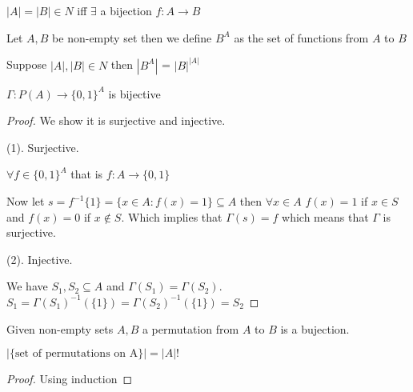 \begin{theorem}
    $|A| = |B| \in N$ iff  $\exists $ a bijection $f : A \rightarrow B$
\end{theorem}

\begin{definition}
    Let $A,B$ be non-empty set then we define $B^{A}$ as the set of functions from $A$ to $B$
\end{definition}

\begin{theorem}
    Suppose $|A|,|B| \in N$ then $|B^{A}|$ = $|B|^{|A|}$
\end{theorem}

\begin{theorem}
    $\Gamma: P(A) \rightarrow \{0,1\}^{A}$ is bijective
\end{theorem}
\begin{proof}
    We show it is surjective and injective.

    (1). Surjective.

    $\forall f \in \{0,1\}^{A}$ that is $f: A \rightarrow \{0,1\}$

Now let  $s = f^{-1}\{1\} = \{x \in A: f(x) = 1\} \subseteq A$ then $\forall x \in A$ $f(x) = 1 $ if $x \in S$ and $f(x) = 0$ if $x \not \in S$. Which implies that  $\Gamma (s) = f$ which means that  $\Gamma$ is surjective.

(2). Injective.

We have $S_1,S_2 \subseteq A$ and $\Gamma(S_1) = \Gamma (S_2)$. $S_1 = \Gamma(S_1)^{-1}(\{1\}) = \Gamma (S_2)^{-1}(\{1\}) = S_2$
\end{proof}
\begin{definition}

    Given non-empty sets  $A,B$ a permutation from $A $ to $B$ is a bujection.
\end{definition}

\begin{theorem}
    $|\{\text{set of permutations on A}\}| = |A|!$
\end{theorem}
\begin{proof}
    Using induction
\end{proof}


